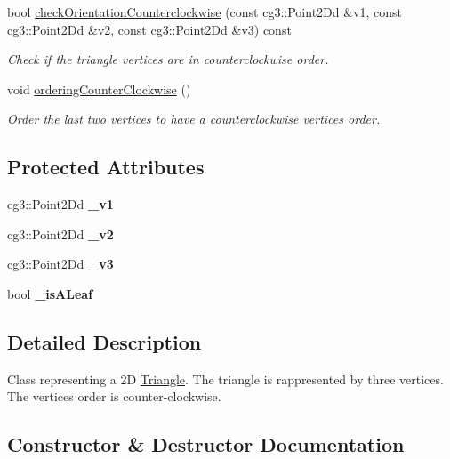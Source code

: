 \begin{DoxyCompactItemize}
bool \hyperlink{classTriangle_ad9b70705bcfcf0fa05f7d504a21df6ed}{check\+Orientation\+Counterclockwise} (const cg3\+::\+Point2\+Dd \&v1, const cg3\+::\+Point2\+Dd \&v2, const cg3\+::\+Point2\+Dd \&v3) const
\begin{DoxyCompactList}\small\item\em Check if the triangle vertices are in counterclockwise order. \end{DoxyCompactList}\item 
void \hyperlink{classTriangle_a09755b9bde993025210c04f6b4b90896}{ordering\+Counter\+Clockwise} ()
\begin{DoxyCompactList}\small\item\em Order the last two vertices to have a counterclockwise vertices order. \end{DoxyCompactList}\end{DoxyCompactItemize}
\subsection*{Protected Attributes}
\begin{DoxyCompactItemize}
\item 
\mbox{\label{classTriangle_ab51536b30b9a7709514e6d10bbf33a4e}} 
cg3\+::\+Point2\+Dd {\bfseries \+\_\+v1}
\item 
\mbox{\label{classTriangle_a98b931dfda3a17c79eba8312f26b6d61}} 
cg3\+::\+Point2\+Dd {\bfseries \+\_\+v2}
\item 
\mbox{\label{classTriangle_a28bee5284bdcb0ff2a23ae6d035a1763}} 
cg3\+::\+Point2\+Dd {\bfseries \+\_\+v3}
\item 
\mbox{\label{classTriangle_a6b674fb1331ad7b25b661f7df8606c63}} 
bool {\bfseries \+\_\+is\+A\+Leaf}
\end{DoxyCompactItemize}


\subsection{Detailed Description}
Class representing a 2D \hyperlink{classTriangle}{Triangle}. The triangle is rappresented by three vertices. The vertices order is counter-\/clockwise. 

\subsection{Constructor \& Destructor Documentation}
\mbox{\label{classTriangle_a3bb081f3c4d90284e27e1005a2b33599}} 
